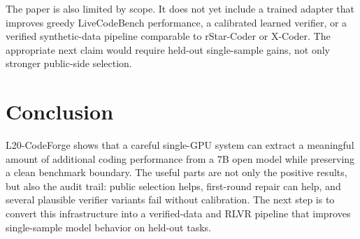 \documentclass[11pt]{article}
\begin{document}
The paper is also limited by scope. It does not yet include a trained adapter
that improves greedy LiveCodeBench performance, a calibrated learned verifier,
or a verified synthetic-data pipeline comparable to rStar-Coder or X-Coder. The
appropriate next claim would require held-out single-sample gains, not only
stronger public-side selection.

\section{Conclusion}

L20-CodeForge shows that a careful single-GPU system can extract a meaningful
amount of additional coding performance from a 7B open model while preserving a
clean benchmark boundary. The useful parts are not only the positive results,
but also the audit trail: public selection helps, first-round repair can help,
and several plausible verifier variants fail without calibration. The next step
is to convert this infrastructure into a verified-data and RLVR pipeline that
improves single-sample model behavior on held-out tasks.



\end{document}
